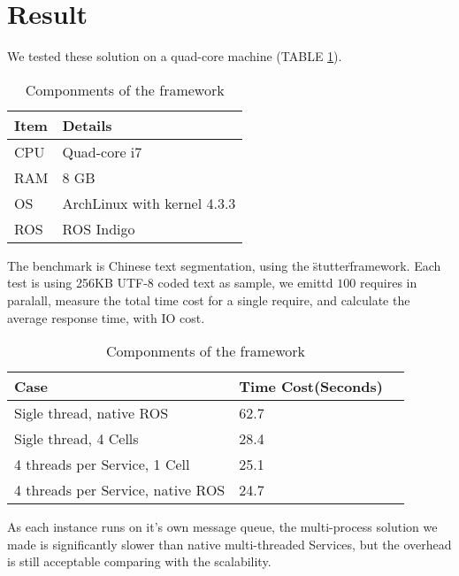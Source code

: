 \section{Result}

We tested these solution on a quad-core machine (TABLE \ref{table:machine}).

\begin{table}[h]
  \renewcommand{\arraystretch}{1.3}
  \caption{Componments of the framework}
  \label{table:machine}
  \centering
  \begin{tabular}{ll}
     \hline
     \bfseries Item & \bfseries Details \\
     \hline
     CPU & Quad-core i7 \\ 
     RAM & 8 GB \\
     OS  & ArchLinux with kernel 4.3.3 \\
     ROS & ROS Indigo \\
     \hline
  \end{tabular}
\end{table} 

The benchmark is Chinese text segmentation, using the \"stutter\" framework.
Each test is using 256KB UTF-8 coded text as sample,
we emittd $100$ requires in paralall, measure the total
time cost for a single require, and calculate the average response time,
with IO cost.

\begin{table}[h]
  \renewcommand{\arraystretch}{1.3}
  \caption{Componments of the framework}
  \label{table:textseg}
  \centering
  \begin{tabular}{lll}
     \hline
     \bfseries Case & \bfseries Time Cost(Seconds) \\
     \hline
     Sigle thread, native ROS          & 62.7 \\
     Sigle thread, 4 Cells             & 28.4 \\
     4 threads per Service, 1 Cell     & 25.1 \\
     4 threads per Service, native ROS & 24.7 \\
     \hline
  \end{tabular}
\end{table} 

As each instance runs on it's own message queue,
the multi-process solution we made is significantly slower than native
multi-threaded Services, but the overhead is still acceptable comparing with
the scalability.
